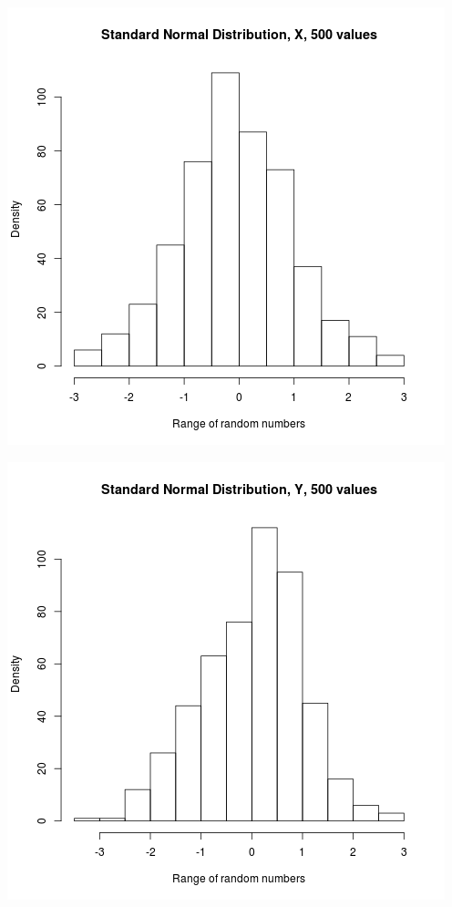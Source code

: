 \documentclass{article}
\begin{document}
\includegraphics{"plot1_2_X"}
\pagebreak

\includegraphics{"plot1_2_Y"}
\pagebreak
\end{document}
